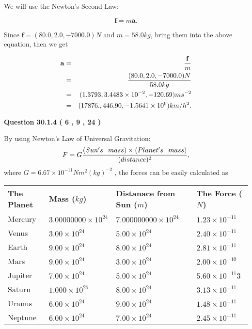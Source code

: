\documentclass[12pt]{article}
\begin{document}
We will use the Newton's Second Law:
 
\[
\mathbf{f}=m\mathbf{a}.
\]
 
Since $\mathbf{f}=( %
80.0,  %
2.0,  %
-7000.0 )N$
and $m= %
58.0 kg$, bring them into the above equation, then we get
 
\begin{eqnarray*}
\mathbf{a}&=&\frac{\mathbf{f}}m  \\
&=&\frac{(
80.0 ,
2.0 ,
-7000.0 )N
}{ %
58.0 kg}  \\
&=&(
1.3793 ,
3.4483 \times 10^{-2},
-120.69
)ms^{-2} \\
&=&(
17876. ,
446.90 ,
-1.5641 \times 10^{6}
)km/h^2.
\end{eqnarray*}
 
  
  
{\textbf{\large{Question
30.1.4 
 (           6 ,           9 ,          24 )
}}}

By using Newton's Law of Universal Gravitation:
\[
F=G \frac{(Sun's \hspace{0.1in} mass) \times (Planet's \hspace{0.1in} mass)} { (distance)^2},
\]
where
$ G= %
6.67 \times 10^{-11} N m^{2}(kg)^{-2}$ , the forces can be easily calculated as
 
\vspace{0.2in}
 
 
\begin{tabular}{|l|l|l|l|}
\hline
The Planet & Mass ($kg$) & Distanace from Sun ($m$) & The Force ($N$)\\
\hline
Mercury  &
           $ %
3.00000000 \times 10^{24}  $   &
             $ %
7.000000000 \times 10^{24}$    & $ %
1.23 \times 10^{-11} $
\\  \hline
Venus    &
           $  %
3.00 \times 10^{24}  $     &
             $ %
5.00 \times 10^{24} $    & $ %
2.40 \times 10^{-11} $
\\  \hline
Earth    &
           $  %
9.00 \times 10^{24}$     &
             $ %
8.00 \times 10^{24} $    & $ %
2.81 \times 10^{-11} $
\\   \hline
Mars     &
           $  %
9.00 \times 10^{24} $     &
             $ %
3.00 \times 10^{24}$    & $ %
2.00 \times 10^{-10} $
\\   \hline
Jupiter  &
           $  %
7.00 \times 10^{24}  $    &
             $ %
5.00 \times 10^{24} $    & $ %
5.60 \times 10^{-11}3 $
\\  \hline
Saturn   &
           $  %
1.000 \times 10^{25}   $    &
             $ %
8.00 \times 10^{24}  $    & $ %
3.13 \times 10^{-11} $
\\  \hline
Uranus   &
           $  %
6.00 \times 10^{24} $    &
             $ %
9.00 \times 10^{24}$    & $ %
1.48 \times 10^{-11} $
\\  \hline
Neptune  &
           $  %
6.00 \times 10^{24}  $    &
             $ %
7.00 \times 10^{24} $    & $ %
2.45 \times 10^{-11} $
\\  \hline
 
\end{tabular}
 
\end{document}

